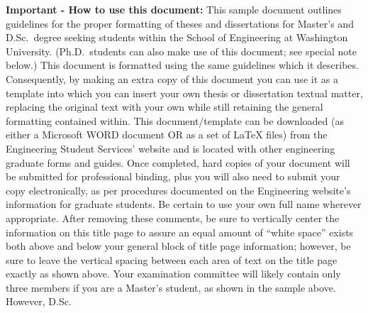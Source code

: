 %


\begin{thesistitlepage}               %
\iffalse
\begin{singlespace}
\tiny
{\small \textbf{Important - How to use this document:}}
This sample document outlines guidelines for the proper formatting of theses
and dissertations for Master's and D.Sc.\ degree seeking students within the
School of Engineering at Washington University.  (Ph.D.\ students can also make
use of this document; see special note below.)  This document is formatted
using the same guidelines which it describes.  Consequently, by making an extra
copy of this document you can use it as a template into which you can insert
your own thesis or dissertation textual matter, replacing the original text
with your own while still retaining the general formatting contained within.
This document/template can be downloaded (as either a Microsoft WORD document
OR as a set of \LaTeX{} files) from the Engineering Student Services' website
and is located with other engineering graduate forms and guides.  Once
completed, hard copies of your document will be submitted for professional
binding, plus you will also need to submit your copy electronically, as per
procedures documented on the Engineering website's information for graduate
students.  Be certain to use your own full name wherever appropriate.  After
removing these comments, be sure to vertically center the information on this
title page to assure an equal amount of ``white space'' exists both above and
below your general block of title page information; however, be sure to leave
the vertical spacing between each area of text on the title page exactly as
shown above.  Your examination committee will likely contain only three members
if you are a Master's student, as shown in the sample above.  However, D.Sc.\

\end{singlespace}
\end{thesistitlepage}
